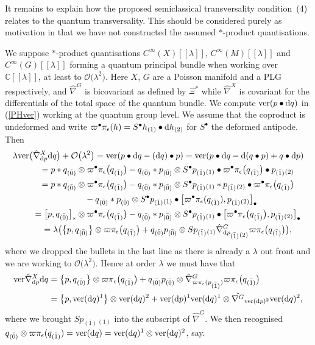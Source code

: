\documentclass[10pt,a4paper]{amsart}
\numberwithin{equation}{section}
\newcommand{\C}{{\mathbb{C}}}
\newcommand{\<}{{\langle}}
\renewcommand{\>}{{\rangle}}
\newcommand{\tens}{\otimes}
\renewcommand{\o}{{}_{\scriptstyle(1)}}
\renewcommand{\t}{{}_{\scriptstyle(2)}}
\newcommand{\extd}{{\rm d}}
\newcommand{\eps}{\epsilon}
\newcommand{\co}{{}_{\scriptstyle \bar{(1)}}}
\newcommand{\rz}{{}_{\scriptstyle \bar{(0)}}}
\begin{document}
It remains to explain how the proposed semiclassical transversality condition~(4) relates to the quantum transversality. This should be considered purely as motivation in that we have not constructed the assumed $*$-product quantisations.

\begin{Remark}\label{defbunrem} We suppose $*$-product quantisations $C^\infty(X)[[\lambda]]$, $C^\infty(M)[[\lambda]]$ and $C^\infty(G)[[\lambda]]$ forming a quantum principal bundle when working over $\C[[\lambda]]$, at least to $\mathcal{O}\big(\lambda^2\big)$. Here $X$, $G$ are a Poisson manifold and a PLG respectively, and $\hat\nabla^G$ is bicovariant as defined by $\Xi^*$ while $\hat\nabla^X$ is covariant for the differentials of the total space of the quantum bundle. We compute $\text{ver}(p\bullet\extd q)$ in (\ref{PHver}) working at the quantum group level. We assume that the coproduct is undeformed and write $\varpi^\bullet\pi_\eps(h)=S^\bullet h\o\bullet \extd h\t$ for $S^\bullet$ the deformed antipode. Then
\begin{gather*} \lambda\text{ver}\big(\hat{\nabla}^X_{\extd p}\extd q\big) +\mathcal{O}\big(\lambda^2\big)=\text{ver}(p\bullet\extd q-(\extd q)\bullet p)=\text{ver}(p\bullet\extd q-\extd(q\bullet p)+q\bullet \extd p)\\
\qquad{} = p* q\rz \tens \varpi^\bullet\pi_\eps\big(q\co\big)-q\rz * p\rz \tens S^\bullet p\co\o \bullet \varpi^\bullet\pi_\eps\big(q\co\big)\bullet p\co\t \\
\qquad{} = p* q\rz \tens \varpi^\bullet\pi_\eps\big(q\co\big)-q\rz * p\rz \tens S^\bullet p\co\o * p\co\t\bullet \varpi^\bullet\pi_\eps\big(q\co\big) \\
\qquad\quad{} -q\rz * p\rz \tens S^\bullet p\co\o \bullet\big[ \varpi^\bullet\pi_\eps(q\co),p\co\t\big]_\bullet\\
\qquad{} = \big[p,q\rz\big]_*\tens \varpi^\bullet\pi_\eps\big(q\co\big) -q\rz * p\rz \tens S^\bullet p\co\o \bullet\big[ \varpi^\bullet\pi_\eps\big(q\co\big),p\co\t\big]_\bullet\\
\qquad{} = \lambda\big(\big\{p,q\rz\big\}\tens \varpi\pi_\eps\big(q\co\big) +q\rz p\rz \tens S p\co\o \hat\nabla^G_{{\rm d}p\co\t} \varpi\pi_\eps\big(q\co\big)\big),
\end{gather*}
where we dropped the bullets in the last line as there is already a $\lambda$ out front and we are working to $\mathcal{O}\big(\lambda^2\big)$. Hence at order $\lambda$ we must have that
\begin{align*}
\text{ver}\hat{\nabla}^X_{\extd p}\extd q&=\big\{p,q\rz\big\}\tens \varpi\pi_\eps\big(q\co\big) +q\rz p\rz \tens \hat\nabla^G_{\varpi\pi_\eps(p\co)} \varpi\pi_\eps\big(q\co\big)\\
& =\big\lbrace p, \text{ver}(\extd q)^1\big\rbrace\tens\text{ver}(\extd q)^2+\text{ver}(\extd p)^1\text{ver}(\extd q)^1\tens \hat{\nabla^G}_{\text{ver}(\extd p)^2}\text{ver}(\extd q)^2,
\end{align*}
where we brought $Sp\co\o$ into the subscript of $\hat\nabla^G$. We then recognised $q\rz\tens\varpi\pi_\eps(q\co)=\text{ver}(\extd q)=\text{ver}(\extd q)^1\tens\text{ver}(\extd q)^2$, say.


\end{Remark}
\end{document}
